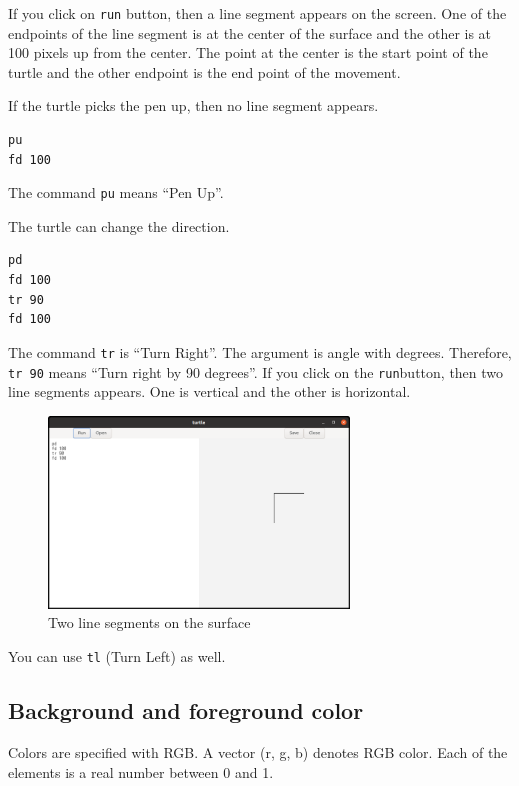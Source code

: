 If you click on \passthrough{\lstinline!run!} button, then a line
segment appears on the screen. One of the endpoints of the line segment
is at the center of the surface and the other is at 100 pixels up from
the center. The point at the center is the start point of the turtle and
the other endpoint is the end point of the movement.

If the turtle picks the pen up, then no line segment appears.

\begin{lstlisting}
pu
fd 100
\end{lstlisting}

The command \passthrough{\lstinline!pu!} means ``Pen Up''.

The turtle can change the direction.

\begin{lstlisting}
pd
fd 100
tr 90
fd 100
\end{lstlisting}

The command \passthrough{\lstinline!tr!} is ``Turn Right''. The argument
is angle with degrees. Therefore, \passthrough{\lstinline!tr 90!} means
``Turn right by 90 degrees''. If you click on the
\passthrough{\lstinline!run!}button, then two line segments appears. One
is vertical and the other is horizontal.

\begin{figure}
\centering
\includegraphics[width=8cm,height=5.11cm]{../src/turtle/image/turtle2.png}
\caption{Two line segments on the surface}
\end{figure}

You can use \passthrough{\lstinline!tl!} (Turn Left) as well.

\subsection{Background and foreground
color}\label{background-and-foreground-color}

Colors are specified with RGB. A vector (r, g, b) denotes RGB color.
Each of the elements is a real number between 0 and 1.

